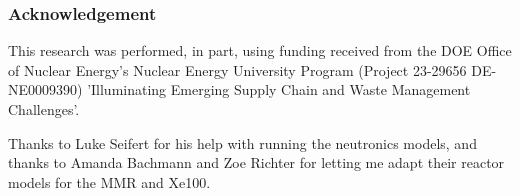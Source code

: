\begin{frame}
  \frametitle{Acknowledgement}
    This research was performed, in part, using funding received from the DOE
    Office of Nuclear Energy's Nuclear Energy University Program (Project 23-29656
    DE-NE0009390) 'Illuminating Emerging Supply Chain and Waste Management
    Challenges'.


    Thanks to Luke Seifert for his help with running the neutronics models, and thanks to Amanda Bachmann and Zoe Richter for letting me adapt their reactor models for the MMR and Xe100.
\end{frame}
